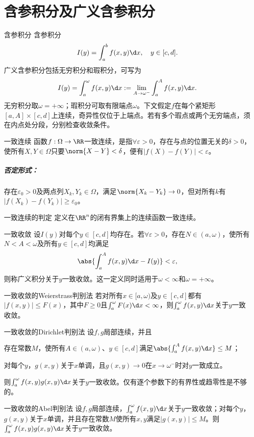 \chapter{含参积分及广义含参积分}
\begin{definition}{含参积分}{}
    含参积分
    \[
        I(y)=\int_a^bf(x,y)\d x,\quad y\in[c,d].
    \]
    广义含参积分包括无穷积分和瑕积分，可写为
    \[
        I(y)=\int_a^\omega f(x,y)\d x:=\lim_{A\to\omega^-}\int_a^Af(x,y)\d x.
    \]
    无穷积分取$\omega=+\infty$；瑕积分可取有限端点$\omega$。下文假定$f$在每个紧矩形$[a,A]\times[c,d]$上连续，奇异性仅位于上端点。若有多个瑕点或两个无穷端点，须在内点处分段，分别检查收敛条件。
\end{definition}
\begin{definition}{一致连续}{}
    函数$f:\Omega\to\RR$一致连续，是指$\forall\varepsilon>0$，存在与点的位置无关的$\delta>0$，使所有$X,Y\in\Omega$只要$\norm{X-Y}<\delta$，便有$|f(X)-f(Y)|<\varepsilon$。
    \tcblower
    \paragraph{否定形式：}存在$\varepsilon_0>0$及两点列$X_k,Y_k\in\Omega$，满足$\norm{X_k-Y_k}\to0$，但对所有$k$有$|f(X_k)-f(Y_k)|\geq\varepsilon_0$。
\end{definition}
\begin{theorem}{一致连续的判定}{}
    定义在$\RR^n$的闭有界集上的连续函数一致连续。
\end{theorem}
\begin{definition}{一致收敛}{}
    设$I(y)$对每个$y\in[c,d]$均存在。若$\forall\varepsilon>0$，存在$N\in(a,\omega)$，使所有$N<A<\omega$及所有$y\in[c,d]$均满足
    \[
        \abs{\int_a^Af(x,y)\d x-I(y)}<\varepsilon,
    \]
    则称广义积分关于$y$一致收敛。这一定义同时适用于$\omega<\infty$和$\omega=+\infty$。
\end{definition}
\begin{theorem}{一致收敛的Weierstrass判别法}{}
    若对所有$x\in[a,\omega)$及$y\in[c,d]$都有$|f(x,y)|\leq F(x)$，其中$F\geq0$且$\int_a^\omega F(x)\d x<\infty$，则$\int_a^\omega f(x,y)\d x$关于$y$一致收敛。
\end{theorem}
\begin{theorem}{一致收敛的Dirichlet判别法}{}
    设$f,g$局部连续，并且
    \begin{compactenum}
        \item 存在常数$M$，使所有$A\in(a,\omega)$、$y\in[c,d]$满足$\abs{\int_a^Af(x,y)\d x}\leq M$；
        \item 对每个$y$，$g(x,y)$关于$x$单调，且$g(x,y)\to0$在$x\to\omega^-$时对$y$一致成立。
    \end{compactenum}
    则$\int_a^\omega f(x,y)g(x,y)\d x$关于$y$一致收敛。仅有逐个参数下的有界性或趋零性是不够的。
\end{theorem}
\begin{theorem}{一致收敛的Abel判别法}{}
    设$f,g$局部连续，$\int_a^\omega f(x,y)\d x$关于$y$一致收敛；对每个$y$，$g(x,y)$关于$x$单调，并且存在常数$M$使所有$x,y$满足$|g(x,y)|\leq M$。则$\int_a^\omega f(x,y)g(x,y)\d x$关于$y$一致收敛。
\end{theorem}
